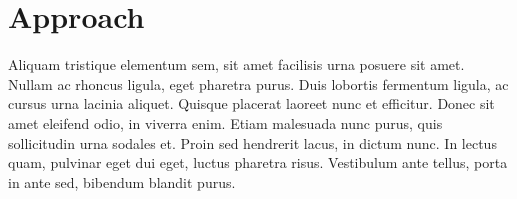 
\chapter{Approach}
\label{approach}

Aliquam tristique elementum sem, sit amet facilisis urna posuere sit amet. Nullam ac rhoncus ligula, eget pharetra purus. Duis lobortis fermentum ligula, ac cursus urna lacinia aliquet. Quisque placerat laoreet nunc et efficitur. Donec sit amet eleifend odio, in viverra enim. Etiam malesuada nunc purus, quis sollicitudin urna sodales et. Proin sed hendrerit lacus, in dictum nunc. In lectus quam, pulvinar eget dui eget, luctus pharetra risus. Vestibulum ante tellus, porta in ante sed, bibendum blandit purus.